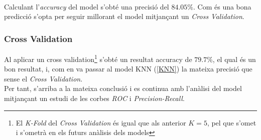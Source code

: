\documentclass[a4paper, 11pt]{article}
\begin{document}
\\
Calculant l'\textit{accuracy} del model s'obté una precisió del $84.05\%$. Com és una bona predicció s'opta per seguir millorant el model mitjançant un \textit{Cross Validation}.

\subsubsection{Cross Validation}
Al aplicar un cross validation\footnote{El \textit{K-Fold} del \textit{Cross Validation} és igual que als anterior $K=5$, pel que s'omet i s'ometrà en els futurs anàlisis dels models} s’obté un resultat accuracy
de $79.7\%$, el qual és un bon resultat, i, com en va passar al model KNN (\textcolor{blue}{\ref{KNN}}) la mateixa precisió que sense el \textit{Cross Validation}. \\ Per tant, s'arriba a la mateixa conclusió i es continua amb l'anàlisi del model mitjançant un estudi de les corbes \textit{ROC} i \textit{Precision-Recall}.
\newpage
\end{document}
